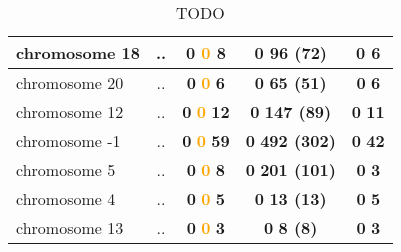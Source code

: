 \begin{table}[H]
\begin{tabular}{||l|c|c|c|c||}
\hline
chromosome 18&..&\textcolor{vert}{\textbf{0}} \textcolor{orange}{\textbf{0}} \textcolor{rose}{\textbf{8}} &\textcolor{vert}{\textbf{0}} \textcolor{rose}{\textbf{96 (72)}} &\textcolor{vert}{\textbf{0}} \textcolor{rose}{\textbf{6}} \\
\hline
chromosome 20&..&\textcolor{vert}{\textbf{0}} \textcolor{orange}{\textbf{0}} \textcolor{rose}{\textbf{6}} &\textcolor{vert}{\textbf{0}} \textcolor{rose}{\textbf{65 (51)}} &\textcolor{vert}{\textbf{0}} \textcolor{rose}{\textbf{6}} \\
\hline
chromosome 12&..&\textcolor{vert}{\textbf{0}} \textcolor{orange}{\textbf{0}} \textcolor{rose}{\textbf{12}} &\textcolor{vert}{\textbf{0}} \textcolor{rose}{\textbf{147 (89)}} &\textcolor{vert}{\textbf{0}} \textcolor{rose}{\textbf{11}} \\
\hline
chromosome -1&..&\textcolor{vert}{\textbf{0}} \textcolor{orange}{\textbf{0}} \textcolor{rose}{\textbf{59}} &\textcolor{vert}{\textbf{0}} \textcolor{rose}{\textbf{492 (302)}} &\textcolor{vert}{\textbf{0}} \textcolor{rose}{\textbf{42}} \\
\hline
chromosome 5&..&\textcolor{vert}{\textbf{0}} \textcolor{orange}{\textbf{0}} \textcolor{rose}{\textbf{8}} &\textcolor{vert}{\textbf{0}} \textcolor{rose}{\textbf{201 (101)}} &\textcolor{vert}{\textbf{0}} \textcolor{rose}{\textbf{3}} \\
\hline
chromosome 4&..&\textcolor{vert}{\textbf{0}} \textcolor{orange}{\textbf{0}} \textcolor{rose}{\textbf{5}} &\textcolor{vert}{\textbf{0}} \textcolor{rose}{\textbf{13 (13)}} &\textcolor{vert}{\textbf{0}} \textcolor{rose}{\textbf{5}} \\
\hline
chromosome 13&..&\textcolor{vert}{\textbf{0}} \textcolor{orange}{\textbf{0}} \textcolor{rose}{\textbf{3}} &\textcolor{vert}{\textbf{0}} \textcolor{rose}{\textbf{8 (8)}} &\textcolor{vert}{\textbf{0}} \textcolor{rose}{\textbf{3}} \\
\hline
\hline
		\end{tabular}
	\caption{TODO}
	\label{tab:TODO}
\end{table}